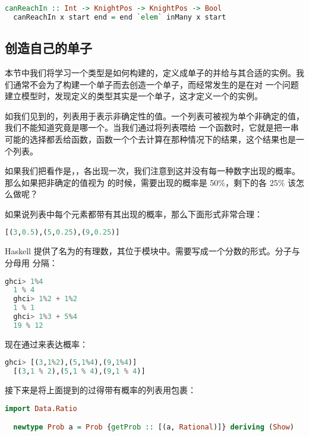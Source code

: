 \documentclass[./main.tex]{subfiles}
\begin{document}
\begin{lstlisting}[language=Haskell]
  canReachIn :: Int -> KnightPos -> KnightPos -> Bool
  canReachIn x start end = end `elem` inMany x start
\end{lstlisting}

\subsection*{创造自己的单子}

本节中我们将学习一个类型是如何构建的，定义成单子的并给与其合适的实例。我们通常不会为了构建一个单子而去创造一个单子，而经常发生的是在对
一个问题建立模型时，发现定义的类型其实是一个单子，这才定义一个的实例。

如我们见到的，列表用于表示非确定性的值。一个\acode{[3,5,9]}列表可被视为单个非确定的值，我们不能知道究竟是哪一个。当我们通过\acode{>>=}将列表喂给
一个函数时，它就是把一串可能的选择都丢给函数，函数一个个去计算在那种情况下的结果，这个结果也是一个列表。

如果我们把\acode{[3,5,9]}看作是，，各出现一次，我们注意到这并没有每一种数字出现的概率。那么如果把非确定的值视为
\acode{[3,5,9]}的时候，需要出现的概率是 50\%，剩下的各 25\% 该怎么做呢？

如果说列表中每个元素都带有其出现的概率，那么下面形式非常合理：

\begin{lstlisting}[language=Haskell]
  [(3,0.5),(5,0.25),(9,0.25)]
\end{lstlisting}

Haskell 提供了名为的有理数，其位于模块中。需要写成一个分数的形式。分子与分母用\acode{\%}
分隔：

\begin{lstlisting}[language=Haskell]
  ghci> 1%4
  1 % 4
  ghci> 1%2 + 1%2
  1 % 1
  ghci> 1%3 + 5%4
  19 % 12
\end{lstlisting}

现在通过来表达概率：

\begin{lstlisting}[language=Haskell]
  ghci> [(3,1%2),(5,1%4),(9,1%4)]
  [(3,1 % 2),(5,1 % 4),(9,1 % 4)]
\end{lstlisting}

接下来是将上面提到的过得带有概率的列表用包裹：

\begin{lstlisting}[language=Haskell]
  import Data.Ratio

  newtype Prob a = Prob {getProb :: [(a, Rational)]} deriving (Show)
\end{lstlisting}
\end{document}
